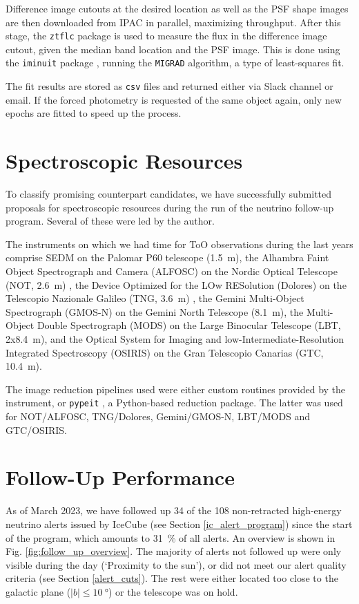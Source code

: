 \documentclass[
    a4paper, %
    fontsize=10pt, %
    twoside=true, %
    numbers=noenddot, %
    fontmethod=tex,
]{kaobook}
\begin{document}
Difference image cutouts at the desired location as well as the PSF shape images are then downloaded from IPAC in parallel, maximizing throughput. After this stage, the \texttt{ztflc} package is used to measure the flux in the difference image cutout, given the median band location and the PSF image. This is done using the \texttt{iminuit} package , running the \texttt{MIGRAD}  algorithm, a type of least-squares fit.

The fit results are stored as \texttt{csv} files and returned either via Slack channel or email. If the forced photometry is requested of the same object again, only new epochs are fitted to speed up the process.

\section{Spectroscopic Resources}
To classify promising counterpart candidates, we have successfully submitted proposals for spectroscopic resources during the run of the neutrino follow-up program. Several of these were led by the author.

The instruments on which we had time for ToO observations during the last years comprise SEDM on the Palomar P60 telescope (\SI{1.5}{\meter}), the Alhambra Faint Object Spectrograph and Camera (ALFOSC) on the Nordic Optical Telescope (NOT, \SI{2.6}{\meter}) , the Device Optimized for the LOw RESolution (Dolores) on the Telescopio Nazionale Galileo (TNG, \SI{3.6}{\meter}) , the Gemini Multi-Object Spectrograph (GMOS-N)  on the Gemini North Telescope (\SI{8.1}{\meter}), the Multi-Object Double Spectrograph (MODS)  on the Large Binocular Telescope (LBT, 2x\SI{8.4}{\meter}), and the Optical System for Imaging and low-Intermediate-Resolution Integrated Spectroscopy (OSIRIS)  on the Gran Telescopio Canarias (GTC, \SI{10.4}{\meter}).

The image reduction pipelines used were either custom routines provided by the instrument, or \texttt{pypeit} , a Python-based reduction package. The latter was used for NOT/ALFOSC, TNG/Dolores, Gemini/GMOS-N, LBT/MODS and GTC/OSIRIS.

\section{Follow-Up Performance}
As of March 2023, we have followed up 34 of the 108 non-retracted high-energy neutrino alerts issued by IceCube (see Section \ref{ic_alert_program}) since the start of the program, which amounts to \SI{31}{\percent} of all alerts. An overview is shown in Fig. \ref{fig:follow_up_overview}. The majority of alerts not followed up were only visible during the day (`Proximity to the sun'), or did not meet our alert quality criteria (see Section \ref{alert_cuts}). The rest were either located too close to the galactic plane ($|b|\leq\SI{10}{\degree}$) or the telescope was on hold.
\end{document}
